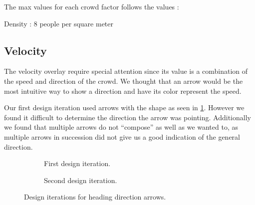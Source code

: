 The max values for each crowd factor follows the values :

\begin{describe}
\item[Density]: 8 people per square meter
\item
\end{describe}


\subsection{Velocity}
The velocity overlay require special attention since its value is a combination of the speed and direction of the crowd. We thought that an arrow would be the most intuitive way to show a direction and have its color represent the speed.


Our first design iteration used arrows with the shape as seen in \cref{fig:first_arrow_design}. However we found it difficult to determine the direction the arrow was pointing. Additionally we found that multiple arrows do not \enquote{compose} as well as we wanted to, as multiple arrows in succession did not give us a good indication of the general direction.



\begin{figure}[htbp]
\begin{subfigure}[c]{.49\linewidth}
    \centering
    \caption{First design iteration.}
    \label{fig:first_arrow_design}
\end{subfigure}
%
\begin{subfigure}[c]{.49\linewidth}
    \centering
    \caption{Second design iteration.}
    \label{fig:second_arrow_design}
\end{subfigure}
\caption{Design iterations for heading direction arrows.}
\end{figure}



